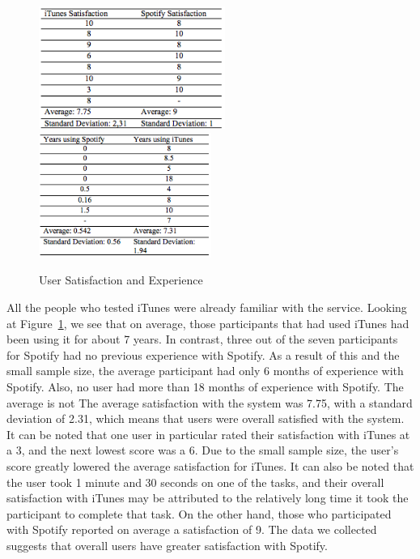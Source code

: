 \documentclass[11pt]{article}
\begin{document}
\begin{figure}[H] %
   \centering
   \includegraphics[width=2.4in]{satisfaction_.png}       
   \includegraphics[width=2.22in]{times_used.png} 
   \caption{User Satisfaction and Experience}
   \label{fig:satisfaction}
\end{figure}

All the people who tested iTunes were already familiar with the service. Looking at Figure~\ref{fig:satisfaction}, we see that on average, those participants that had used iTunes had been using it for about 7 years. In contrast, three out of the seven participants for Spotify had no previous experience with Spotify. As a result of this and the small sample size, the average participant had only 6 months of experience with Spotify. Also, no user had more than 18 months of experience with Spotify. The average is not %
The average satisfaction with the system was 7.75, with a standard deviation of 2.31, which means that users were overall satisfied with the system. It can be noted that one user in particular rated their satisfaction with iTunes at a 3, and the next lowest score was a 6. Due to the small sample size, the user's score greatly lowered the average satisfaction for iTunes. It can also be noted that the user took 1 minute and 30 seconds on one of the tasks, and their overall satisfaction with iTunes may be attributed to the relatively long time it took the participant to complete that task. On the other hand, those who participated with Spotify reported on average a satisfaction of 9. The data we collected suggests that overall users have greater satisfaction with Spotify.
\end{document}
